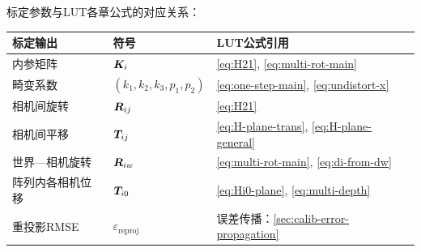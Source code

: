 \begin{finalbox}
标定参数与LUT各章公式的对应关系：
\begin{center}
\small
\begin{tabular}{lll}
\toprule
\textbf{标定输出} & \textbf{符号} & \textbf{LUT公式引用} \\
\midrule
内参矩阵       & $\bm{K}_i$ & \cref{eq:H21}, \eqref{eq:multi-rot-main} \\
畸变系数       & $(k_1,k_2,k_3,p_1,p_2)$ & \cref{eq:one-step-main}, \eqref{eq:undistort-x} \\
相机间旋转     & $\bm{R}_{ij}$ & \cref{eq:H21} \\
相机间平移     & $\bm{T}_{ij}$ & \cref{eq:H-plane-trans}, \eqref{eq:H-plane-general} \\
世界—相机旋转 & $\bm{R}_{iw}$ & \cref{eq:multi-rot-main}, \eqref{eq:di-from-dw} \\
阵列内各相机位移 & $\bm{T}_{i0}$ & \cref{eq:Hi0-plane}, \eqref{eq:multi-depth} \\
重投影RMSE    & $\varepsilon_{\text{reproj}}$ & 误差传播：\cref{sec:calib-error-propagation} \\
\bottomrule
\end{tabular}
\end{center}
\end{finalbox}
